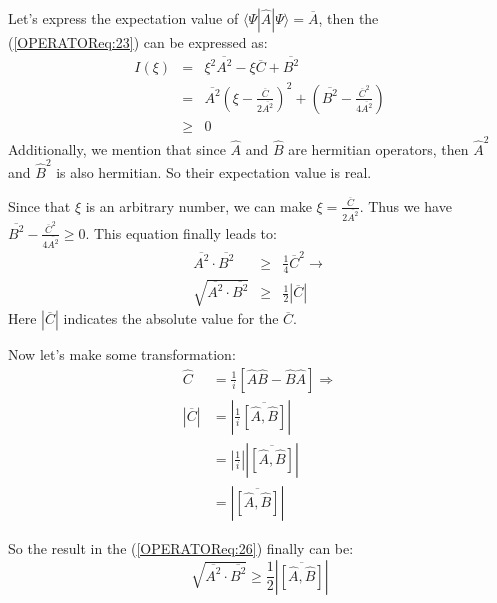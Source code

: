 Let's express the expectation value of
$\langle\Psi|\hat{A}|\Psi\rangle = \overline{A}$, then the
(\ref{OPERATOReq:23}) can be expressed as:
\begin{eqnarray}\label{EIGENCTONSeq:4}
  I(\xi) &=& \xi^{2}\overline{A^{2}} - \xi\overline{C} +
  \overline{B^{2}} \nonumber \\
  &=& \overline{A^{2}}
  \left ( \xi - \frac{\overline{C}}{2\overline{A^{2}}}\right)^{2} +
  \left ( \overline{B^{2}} - \frac{\overline{C}^{2}}{4\overline{A^{2}}}
  \right) \nonumber \\
  &\geq& 0
\end{eqnarray}
Additionally, we mention that since $\hat{A}$ and $\hat{B}$ are
hermitian operators, then $\hat{A}^{2}$ and $\hat{B}^{2}$ is also
hermitian. So their expectation value is real.

Since that $\xi$ is an arbitrary number, we can make $\xi =
\frac{\overline{C}}{2\overline{A^{2}}}$. Thus we have
$\overline{B^{2}} - \frac{\overline{C}^{2}}{4\overline{A^{2}}} \geq
0$. This equation finally leads to:
\begin{eqnarray}\label{OPERATOReq:26}
  \overline{A^{2}}\cdot
\overline{B^{2}} &\geq&  \frac{1}{4}\overline{C}^{2} \rightarrow \nonumber \\
 \sqrt{ \overline{A^{2}}\cdot
\overline{B^{2}}} &\geq&  \frac{1}{2} |\overline{C}|
\end{eqnarray}
Here $|\overline{C}|$ indicates the absolute value for the
$\overline{C}$.

Now let's make some transformation:
\begin{equation}\label{}
\begin{split}
  \hat{C} &= \frac{1}{i}
  [\hat{A}\hat{B} - \hat{B}\hat{A}] \Rightarrow \\
   |\overline{C}| &= |\frac{1}{i}\overline{[\hat{A},\hat{B}]}|
   \\
   &= |\frac{1}{i}| |\overline{[\hat{A},\hat{B}]}| \\
   &= |\overline{[\hat{A},\hat{B}]}|
\end{split}
\end{equation}

So the result in the (\ref{OPERATOReq:26}) finally can be:
\begin{equation}\label{OPERATOReq:27}
\sqrt{\overline{A^{2}}\cdot \overline{B^{2}}}   \geq \frac{1}{2}
\left|\overline{[\hat{A}, \hat{B}]} \right|
\end{equation}

